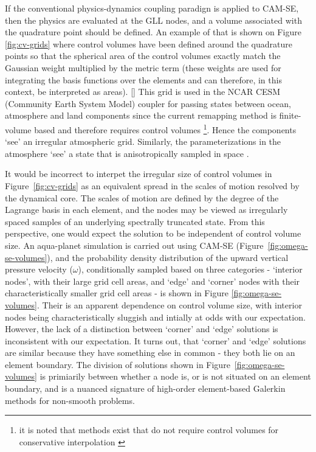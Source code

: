 \documentclass[twocol]{ametsoc}
\begin{document}
If the conventional physics-dynamics coupling paradign is applied to CAM-SE, then the physics are evaluated at the GLL nodes, and a volume associated with the quadrature point should be defined. An example of that is shown on Figure \ref{fig:cv-grids} where control volumes have been defined around the quadrature points so that the spherical area of the control volumes exactly match the Gaussian weight multiplied by the metric term (these weights are used for integrating the basis functions over the elements and can therefore, in this context, be interpreted as areas). [{\color{red}{Mark: could we be mathematically more rigorous? perhaps an appendix describing the iterative algorithm?}}] This grid is used in the NCAR CESM (Community Earth System Model) coupler for passing states between ocean, atmosphere and land components since the current remapping method is finite-volume based and therefore requires control volumes {\footnote{it is noted that methods exist that do not require control volumes for conservative interpolation \citep{UT2015MWR}}}. Hence the components `see' an irregular atmospheric grid. Similarly, the parameterizations in the atmosphere `see' a state that is anisotropically sampled in space \citep[see Figure 1 and 5 in ][]{KetAl2008JGR}.%

It would be incorrect to interpet the irregular size of control volumes in Figure~\ref{fig:cv-grids} as an equivalent spread in the scales of motion resolved by the dynamical core. The scales of motion are defined by the degree of the Lagrange basis in each element, and the nodes may be viewed as irregularly spaced samples of an underlying spectrally truncated state. From this perspective, one would expect the solution to be independent of control volume size. An aqua-planet simulation \citep{NH2000ASL,MWO2016JAMES} is carried out using CAM-SE (Figure~\ref{fig:omega-se-volumes}), and the probability density distribution of the upward vertical pressure velocity ($\omega$), conditionally sampled based on three categories - `interior nodes', with their large grid cell areas, and `edge' and `corner' nodes with their characteristically smaller grid cell areas - is shown in Figure \ref{fig:omega-se-volumes}. Their is an apparent dependence on control volume size, with interior nodes being characteristically sluggish and intially at odds with our expectation. However, the lack of a distinction between `corner' and `edge' solutions is inconsistent with our expectation. It turns out, that `corner' and `edge' solutions are similar because they have something else in common - they both lie on an element boundary. The division of solutions shown in Figure~\ref{fig:omega-se-volumes} is primiarily between whether a node is, or is not situated on an element boundary, and is a nuanced signature of high-order element-based Galerkin methods for non-smooth problems.
\end{document}
